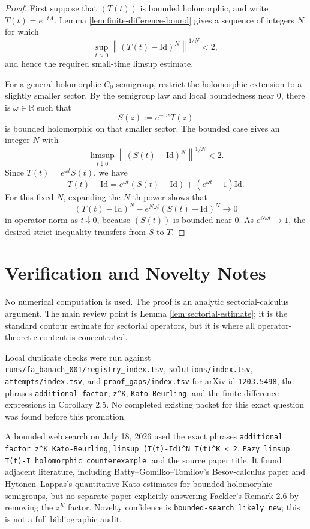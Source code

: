 \documentclass[11pt]{article}
\newcommand{\R}{\mathbb{R}}
\newcommand{\Id}{\mathrm{Id}}
\newcommand{\norm}[1]{\left\lVert #1 \right\rVert}
\begin{document}
\begin{proof}
First suppose that \((T(t))\) is bounded holomorphic, and write
\(T(t)=e^{-tA}\).  Lemma \ref{lem:finite-difference-bound} gives a sequence
of integers \(N\) for which
\[
  \sup_{t>0}\norm{(T(t)-\Id)^N}^{1/N}<2,
\]
and hence the required small-time limsup estimate.

For a general holomorphic \(C_0\)-semigroup, restrict the holomorphic
extension to a slightly smaller sector.  By the semigroup law and local
boundedness near \(0\), there is \(\omega\in\R\) such that
\[
  S(z):=e^{-\omega z}T(z)
\]
is bounded holomorphic on that smaller sector.  The bounded case gives an
integer \(N\) with
\[
  \limsup_{t\downarrow0}\norm{(S(t)-\Id)^N}^{1/N}<2.
\]
Since \(T(t)=e^{\omega t}S(t)\), we have
\[
  T(t)-\Id=e^{\omega t}(S(t)-\Id)+(e^{\omega t}-1)\Id .
\]
For this fixed \(N\), expanding the \(N\)-th power shows that
\[
  (T(t)-\Id)^N-e^{N\omega t}(S(t)-\Id)^N\to0
\]
in operator norm as \(t\downarrow0\), because \((S(t))\) is bounded near
\(0\).  As \(e^{N\omega t}\to1\), the desired strict inequality transfers
from \(S\) to \(T\).
\end{proof}

\section*{Verification and Novelty Notes}

No numerical computation is used.  The proof is an analytic sectorial-calculus
argument.  The main review point is Lemma \ref{lem:sectorial-estimate}; it is
the standard contour estimate for sectorial operators, but it is where all
operator-theoretic content is concentrated.

Local duplicate checks were run against
\texttt{runs/fa\_banach\_001/registry\_index.tsv},
\texttt{solutions/index.tsv}, \texttt{attempts/index.tsv}, and
\texttt{proof\_gaps/index.tsv} for arXiv id \texttt{1203.5498}, the phrases
\texttt{additional factor}, \texttt{z\^{}K}, \texttt{Kato-Beurling}, and the
finite-difference expressions in Corollary 2.5.  No completed existing packet
for this exact question was found before this promotion.

A bounded web search on July 18, 2026 used the exact phrases
\texttt{additional factor z\^{}K Kato-Beurling},
\texttt{limsup (T(t)-Id)\^{}N T(t)\^{}K < 2},
\texttt{Pazy limsup T(t)-I holomorphic counterexample}, and the source paper
title.  It found adjacent literature, including Batty--Gomilko--Tomilov's
Besov-calculus paper and Hytönen--Lappas's quantitative Kato estimates for
bounded holomorphic semigroups, but no separate paper explicitly answering
Fackler's Remark 2.6 by removing the \(z^K\) factor.  Novelty confidence is
\texttt{bounded-search likely new}; this is not a full bibliographic audit.
\end{document}
